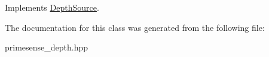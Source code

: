 Implements \hyperlink{classfovis_1_1DepthSource_ad0d2b9dd0e48e428319c3c84e87fa5cf}{DepthSource}.



The documentation for this class was generated from the following file:\begin{DoxyCompactItemize}
\item 
primesense\_\-depth.hpp\end{DoxyCompactItemize}
